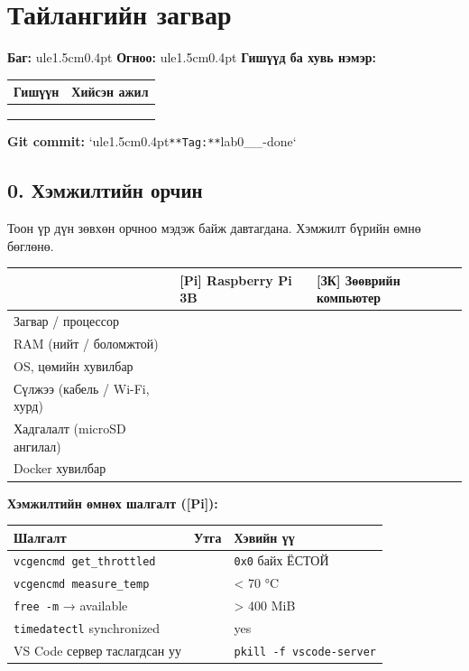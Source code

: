 \chapter{Тайлангийн загвар}

\textbf{Баг:} ule{1.5cm}{0.4pt} \textbf{Огноо:} ule{1.5cm}{0.4pt}
\textbf{Гишүүд ба хувь нэмэр:}

\begingroup\scriptsize\begin{longtable}[]{@{}ll@{}}
\toprule
Гишүүн & Хийсэн ажил\tabularnewline
\midrule
\endhead
&\tabularnewline
&\tabularnewline
&\tabularnewline
\bottomrule
\end{longtable}\endgroup

\textbf{Git commit:} `ule{1.5cm}{0.4pt}\texttt{**Tag:**}lab0\_\_-done`

\hypertarget{ux445ux44dux43cux436ux438ux43bux442ux438ux439ux43d-ux43eux440ux447ux438ux43d}{%
\section{0. Хэмжилтийн орчин}\label{ux445ux44dux43cux436ux438ux43bux442ux438ux439ux43d-ux43eux440ux447ux438ux43d}}

Тоон үр дүн зөвхөн орчноо мэдэж байж давтагдана. Хэмжилт бүрийн өмнө бөглөнө.

\begingroup\scriptsize\begin{longtable}[]{@{}lll@{}}
\toprule
& {[}Pi{]} Raspberry Pi 3B & {[}ЗК{]} Зөөврийн компьютер\tabularnewline
\midrule
\endhead
Загвар / процессор & &\tabularnewline
RAM (нийт / боломжтой) & &\tabularnewline
OS, цөмийн хувилбар & &\tabularnewline
Сүлжээ (кабель / Wi-Fi, хурд) & &\tabularnewline
Хадгалалт (microSD ангилал) & &\tabularnewline
Docker хувилбар & &\tabularnewline
\bottomrule
\end{longtable}\endgroup

\textbf{Хэмжилтийн өмнөх шалгалт ({[}Pi{]}):}

\begingroup\scriptsize\begin{longtable}[]{@{}lll@{}}
\toprule
Шалгалт & Утга & Хэвийн үү\tabularnewline
\midrule
\endhead
\texttt{vcgencmd\ get\_\allowbreak{}throttled} & & \texttt{0x0} байх ЁСТОЙ\tabularnewline
\texttt{vcgencmd\ measure\_\allowbreak{}temp} & & \textless{} 70 °C\tabularnewline
\texttt{free\ -m} → available & & \textgreater{} 400 MiB\tabularnewline
\texttt{timedatectl} synchronized & & yes\tabularnewline
VS Code сервер таслагдсан уу & & \texttt{pkill\ -f\ vscode-server}\tabularnewline
\bottomrule
\end{longtable}\endgroup


